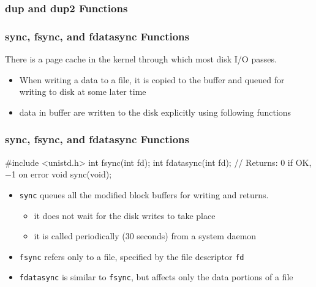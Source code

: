 \documentclass[newPxFont,sthlmFooter,nooffset]{beamer}
\begin{document}
\begin{frame}
  \frametitle{dup and dup2 Functions}
\end{frame}


\begin{frame}[containsverbatim,t]
  \frametitle{sync, fsync, and fdatasync Functions}
There is a page cache in the kernel through which most disk I/O passes.
\begin{itemize}
\item When writing a data to a file, it is copied to the buffer and queued for writing to disk at some later time
\item data in buffer are written to the disk explicitly using following functions
\end{itemize}
\end{frame}

\begin{frame}[containsverbatim,t]
  \frametitle{sync, fsync, and fdatasync Functions}
\begin{codedef}
#include <unistd.h>
int fsync(int fd);
int fdatasync(int fd);
// Returns: 0 if OK, −1 on error
void sync(void);
\end{codedef}

\begin{itemize}
\item \texttt{sync} queues all the modified block buffers for writing and returns.
  \begin{itemize}
  \item it does not wait for the disk writes to take place
  \item it is called periodically (30 seconds) from a system daemon
  \end{itemize}
\item \texttt{fsync} refers only to a file, specified by the file descriptor \texttt{fd}
\item \texttt{fdatasync} is similar to \texttt{fsync}, but affects only the data portions of a file
\end{itemize}

\end{frame}
\end{document}

